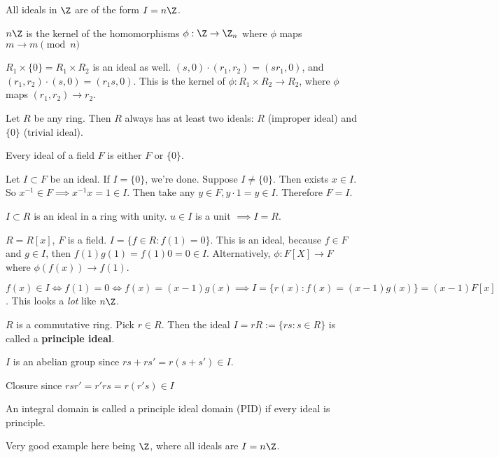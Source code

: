 \documentclass[twoside, 10pt]{article}
\begin{document}
\begin{cor}
    All ideals in $\Z$ are of the form $I = n\Z$.
\end{cor}

$n\Z$ is the kernel of the homomorphisms $\phi: \Z \to \Z_n$ where $\phi$ maps $m \to m\pmod{n}$

\begin{exm*}
    $R_1 \times \{0\}= R_1 \times R_2$ is an ideal as well. $(s, 0)\cdot (r_1, r_2) = (sr_1, 0)$, and $(r_1, r_2)\cdot (s, 0) = (r_1s, 0)$. This is the kernel of $\phi: R_1 \times R_2 \to R_2$, where $\phi$ maps $(r_1, r_2) \to r_2$. 
\end{exm*}

Let $R$ be any ring. Then $R$ always has at least two ideals: $R$ (improper ideal) and $\{0\}$ (trivial ideal).

\begin{rmk}
    Every ideal of a field $F$ is either $F$ or $\{0\}$.
\end{rmk}
Let $I \subset F$ be an ideal. If $I = \{0\}$, we're done. Suppose $I \neq \{0\}$. Then exists $x\in I$. So $x^{-1} \in F \implies x^{-1}x = 1 \in I$. Then take any $y \in F, y \cdot 1 = y \in I$. Therefore $F = I$.

\begin{cor}
    $I \subset R$ is an ideal in a ring with unity. $u\in I$ is a unit $\implies I = R$.
\end{cor}

\begin{exm*}
    $R = R[x]$, $F$ is a field. $I = \{f \in R: f(1) = 0\}$. This is an ideal, because $f\in F$ and $g\in I$, then $f(1)g(1) = f(1)0 = 0 \in I$. Alternatively, $\phi: F[X] \to F$ where $\phi(f(x)) \to f(1)$.
\end{exm*}
$f(x) \in I \iff f(1) = 0 \iff f(x) = (x-1)g(x) \implies I = \{r(x) : f(x) = (x-1)g(x)\} = (x-1)F[x]$. This looks a \emph{lot} like $n\Z$. 

\begin{defn}
    $R$ is a commutative ring. Pick $r \in R$. Then the ideal $I = rR := \{rs: s \in R\}$ is called a \textbf{principle ideal}.
\end{defn}

$I$ is an abelian group since $rs + rs' = r(s + s') \in I$.

Closure since $rsr' = r'rs = r(r's) \in I$

\begin{defn}
    An integral domain is called a principle ideal domain (PID) if every ideal is principle.
\end{defn}
Very good example here being $\Z$, where all ideals are $I = n\Z$.
\end{document}
